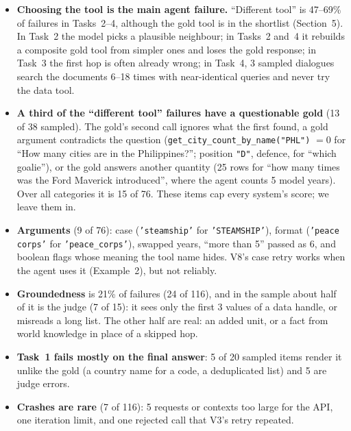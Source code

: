 \documentclass[10pt]{article}
\begin{document}
\begin{itemize}
\item \textbf{Choosing the tool is the main agent failure.} ``Different tool'' is 47--69\% of
  failures in Tasks~2--4, although the gold tool is in the shortlist (Section~5). In Task~2 the
  model picks a plausible neighbour; in Tasks~2 and~4 it rebuilds a composite gold tool from
  simpler ones and loses the gold response; in Task~3 the first hop is often already wrong; in
  Task~4, 3 sampled dialogues search the documents 6--18 times with near-identical queries and
  never try the data tool.
\item \textbf{A third of the ``different tool'' failures have a questionable gold} (13 of 38
  sampled). The gold's second call ignores what the first found, a gold argument contradicts the
  question (\texttt{get\_city\_count\_by\_name("PHL")} $=0$ for ``How many cities are in the
  Philippines?''; position \texttt{"D"}, defence, for ``which goalie''), or the gold answers another
  quantity (25 rows for ``how many times was the Ford Maverick introduced'', where the agent counts
  5 model years). Over all categories it is 15 of 76. These items cap every system's score; we
  leave them in.
\item \textbf{Arguments} (9 of 76): case (\texttt{'steamship'} for \texttt{'STEAMSHIP'}), format
  (\texttt{'peace corps'} for \texttt{'peace\_corps'}), swapped years, ``more than 5'' passed as 6,
  and boolean flags whose meaning the tool name hides. V8's case retry works when the agent uses it
  (Example~2), but not reliably.
\item \textbf{Groundedness} is 21\% of failures (24 of 116), and in the sample about half of it is
  the judge (7 of 15): it sees only the first 3 values of a data handle, or misreads a long list.
  The other half are real: an added unit, or a fact from world knowledge in place of a skipped hop.
\item \textbf{Task~1 fails mostly on the final answer}: 5 of 20 sampled items render it unlike the
  gold (a country name for a code, a deduplicated list) and 5 are judge errors.
\item \textbf{Crashes are rare} (7 of 116): 5 requests or contexts too large for the API, one
  iteration limit, and one rejected call that V3's retry repeated.
\end{itemize}
\end{document}
